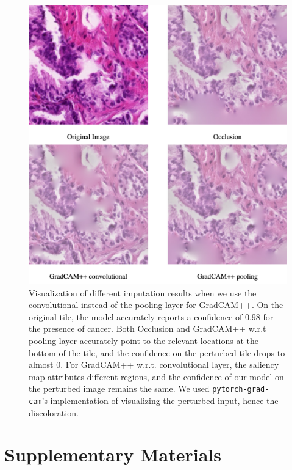 \begin{figure}
    \begin{center}
    \begin{minipage}{0.7\textwidth}
      \includegraphics[width=\textwidth]{img/gradcampp-road-conv-vs-pool.png}
    \end{minipage}
    \caption{
    Visualization of different imputation results when we use the convolutional instead of the pooling layer for GradCAM++.
    On the original tile, the model accurately reports a confidence of $0.98$ for the presence of cancer.
    Both Occlusion and GradCAM++ w.r.t pooling layer accurately point to the relevant locations at the bottom of the tile, and the confidence on the perturbed tile drops to almost $0$.
    For GradCAM++ w.r.t. convolutional layer, the saliency map attributes different regions, and the confidence of our model on the perturbed image remains the same.
    We used \texttt{pytorch-grad-cam}'s implementation of visualizing the perturbed input, hence the discoloration.
    }
    \label{fig:gradcampp-road-conv-vs-pool}
    \end{center}
\end{figure}

\pagebreak

\section{Supplementary Materials}\label{sec:imple}

